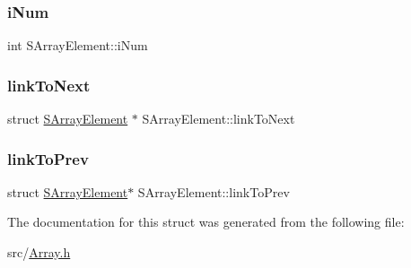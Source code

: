 \subsubsection{\texorpdfstring{i\+Num}{iNum}}
{\footnotesize\ttfamily int S\+Array\+Element\+::i\+Num}

\mbox{\label{struct_s_array_element_a1ca4331e530d168177a231b87f3c39af}} 
\subsubsection{\texorpdfstring{link\+To\+Next}{linkToNext}}
{\footnotesize\ttfamily struct \hyperlink{struct_s_array_element}{S\+Array\+Element} $\ast$ S\+Array\+Element\+::link\+To\+Next}

\mbox{\label{struct_s_array_element_a3bfdbcb5a8d34670a0a67e3e91c0646f}} 
\subsubsection{\texorpdfstring{link\+To\+Prev}{linkToPrev}}
{\footnotesize\ttfamily struct \hyperlink{struct_s_array_element}{S\+Array\+Element}$\ast$ S\+Array\+Element\+::link\+To\+Prev}



The documentation for this struct was generated from the following file\+:\begin{DoxyCompactItemize}
\item 
src/\hyperlink{_array_8h}{Array.\+h}\end{DoxyCompactItemize}
